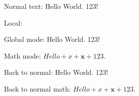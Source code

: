 \documentclass{article}
\begin{document}
Normal text: Hello World. 123!

Local: 

\galacticmode
Global mode: Hello World. 123!

Math mode: $Hello + x + \mathbf{x} + 123$.
\normalmode

Back to normal: Hello World. 123!

Back to normal math: $Hello + x + \mathbf{x} + 123$.
\end{document}

